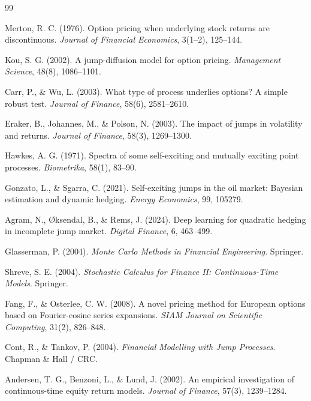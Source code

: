 \documentclass[12pt]{article}
\begin{document}
\begin{thebibliography}{99}

Merton, R. C. (1976).
Option pricing when underlying stock returns are discontinuous.
\textit{Journal of Financial Economics}, 3(1--2), 125--144.

Kou, S. G. (2002).
A jump-diffusion model for option pricing.
\textit{Management Science}, 48(8), 1086--1101.

Carr, P., \& Wu, L. (2003).
What type of process underlies options? A simple robust test.
\textit{Journal of Finance}, 58(6), 2581--2610.

Eraker, B., Johannes, M., \& Polson, N. (2003).
The impact of jumps in volatility and returns.
\textit{Journal of Finance}, 58(3), 1269--1300.

Hawkes, A. G. (1971).
Spectra of some self-exciting and mutually exciting point processes.
\textit{Biometrika}, 58(1), 83--90.

Gonzato, L., \& Sgarra, C. (2021).
Self-exciting jumps in the oil market: Bayesian estimation and dynamic hedging.
\textit{Energy Economics}, 99, 105279.

Agram, N., {\O}ksendal, B., \& Rems, J. (2024).
Deep learning for quadratic hedging in incomplete jump market.
\textit{Digital Finance}, 6, 463--499.

Glasserman, P. (2004).
\textit{Monte Carlo Methods in Financial Engineering}.
Springer.

Shreve, S. E. (2004).
\textit{Stochastic Calculus for Finance II: Continuous-Time Models}.
Springer.

Fang, F., \& Osterlee, C. W. (2008).
A novel pricing method for European options based on Fourier-cosine series expansions.
\textit{SIAM Journal on Scientific Computing}, 31(2), 826--848.

Cont, R., \& Tankov, P. (2004).
\textit{Financial Modelling with Jump Processes}.
Chapman \& Hall / CRC.

Andersen, T. G., Benzoni, L., \& Lund, J. (2002).
An empirical investigation of continuous-time equity return models.
\textit{Journal of Finance}, 57(3), 1239--1284.


\end{thebibliography}
\end{document}
